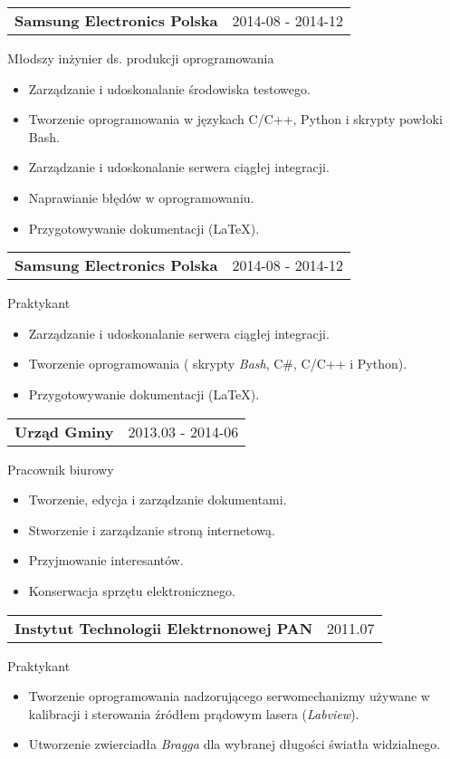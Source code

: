 \documentclass{article}
\begin{document}
\begin{tabular}{@{} m{} R{0.37\textwidth} }
\textbf{Samsung Electronics Polska}	& {2014-08 - 2014-12} 
\end{tabular}
Młodszy inżynier ds. produkcji oprogramowania\\
\begin{itemize}
	\item Zarządzanie i udoskonalanie środowiska testowego.
	\item Tworzenie oprogramowania w językach C/C++, Python i skrypty powłoki Bash.
	\item Zarządzanie i udoskonalanie serwera ciągłej integracji. 
	\item Naprawianie błędów w oprogramowaniu.
	\item Przygotowywanie dokumentacji (\LaTeX).
\end{itemize}
\begin{tabular}{@{} m{} R{0.37\textwidth} }
	{ \textbf{Samsung Electronics Polska}}	& {2014-08 - 2014-12} 
\end{tabular}
Praktykant\\
\begin{itemize}
	\item Zarządzanie i udoskonalanie serwera ciągłej integracji. 
	\item Tworzenie oprogramowania ( skrypty \emph{Bash}, C\#, C/C++ i Python).
	\item Przygotowywanie dokumentacji (\LaTeX).
\end{itemize}
\begin{tabular}{@{} m{} R{0.37\textwidth} }
\textbf{Urząd Gminy}	& {2013.03 - 2014-06} 
\end{tabular}
Pracownik biurowy\\
\begin{itemize}
	\item Tworzenie, edycja i zarządzanie dokumentami.
	\item Stworzenie i zarządzanie stroną internetową.
	\item Przyjmowanie interesantów.
	\item Konserwacja sprzętu elektronicznego.
\end{itemize}

\begin{tabular}{@{} m{} R{0.47\textwidth} }
\textbf{Instytut Technologii Elektrnonowej PAN}	& {2011.07} 
\end{tabular}
Praktykant\\
\begin{itemize}
	\item Tworzenie oprogramowania nadzorującego serwomechanizmy używane w kalibracji i sterowania źródłem prądowym  lasera (\emph{Labview}).
	\item Utworzenie zwierciadła \emph{Bragga} dla wybranej długości światła widzialnego.
\end{itemize}
\end{document}
